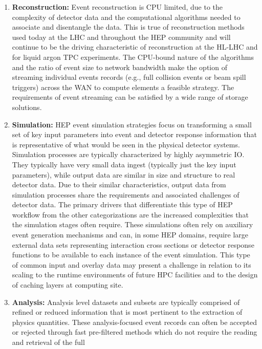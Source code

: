 \documentclass[12pt,a4paper]{article}
\begin{document}
\begin{enumerate}
\def\labelenumi{\arabic{enumi})}
\item \textbf{Reconstruction:} Event reconstruction is CPU limited, due to
  the complexity of detector data and the computational algorithms
  needed to associate and disentangle the data. This is true of
  reconstruction methods used today at the LHC and throughout the HEP
  community and will continue to be the driving characteristic of
  reconstruction at the HL-LHC and for liquid argon TPC experiments. The
  CPU-bound nature of the algorithms and the ratio of event size to
  network bandwidth make the option of streaming individual events
  records (e.g., full collision events or beam spill triggers)
  across the WAN to compute elements a feasible
  strategy. The requirements of event streaming can be
  satisfied by a wide range of storage solutions.
\item \textbf{Simulation:} HEP event simulation strategies focus on
  transforming a small set of key input parameters into event and
  detector response information that is representative of what would be
  seen in the physical detector systems. Simulation processes are
  typically characterized by highly asymmetric IO. They typically have very small data ingest (typically just the key input
  parameters), while output data are similar in size and
  structure to real detector data. Due to their similar characteristics, output data from simulation processes share the requirements and associated challenges of detector data. The primary drivers that differentiate
  this type of HEP workflow from the other categorizations are the
  increased complexities that the simulation stages often require. These
  simulations often rely on auxiliary event generation mechanisms and
  can, in some HEP domains, require large external data sets
  representing interaction cross sections or detector response functions
  to be available to each instance of the event simulation. This type of
  common input and overlay data may present a challenge in relation to
  its scaling to the runtime environments of future HPC facilities and
  to the design of caching layers at computing site.
\item \textbf{Analysis:} Analysis level datasets and subsets are typically
  comprised of refined or reduced information that is most pertinent to
  the extraction of physics quantities. These analysis-focused event
  records can often be accepted or rejected through fast pre-filtered
  methods which do not require the reading and retrieval of the full

\end{enumerate}
\end{document}
